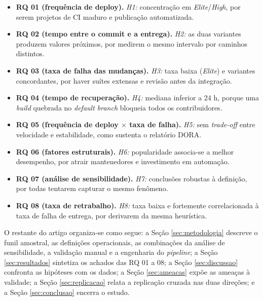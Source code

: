 \begin{itemize}
  \item \textbf{RQ 01 (frequência de deploy).} \emph{H1:} concentração em \emph{Elite}/\emph{High}, por serem
    projetos de CI maduro e publicação automatizada.
  \item \textbf{RQ 02 (tempo entre o commit e a entrega).} \emph{H2:} as duas variantes produzem valores próximos, por
    medirem o mesmo intervalo por caminhos distintos.
  \item \textbf{RQ 03 (taxa de falha das mudanças).} \emph{H3:} taxa baixa (\emph{Elite}) e variantes concordantes,
    por haver suítes extensas e revisão antes da integração.
  \item \textbf{RQ 04 (tempo de recuperação).} \emph{H4:} mediana inferior a 24 h, porque uma
    \emph{build} quebrada no \emph{default branch} bloqueia todos os contribuidores.
  \item \textbf{RQ 05 (frequência de deploy $\times$ taxa de falha).} \emph{H5:} sem \emph{trade-off} entre velocidade e
    estabilidade, como sustenta o relatório DORA.
  \item \textbf{RQ 06 (fatores estruturais).} \emph{H6:} popularidade associa-se a melhor desempenho,
    por atrair mantenedores e investimento em automação.
  \item \textbf{RQ 07 (análise de sensibilidade).} \emph{H7:} conclusões robustas à definição, por todas
    tentarem capturar o mesmo fenômeno.
  \item \textbf{RQ 08 (taxa de retrabalho).} \emph{H8:} taxa baixa e fortemente correlacionada à taxa de falha
    de entrega, por derivarem da mesma heurística.
\end{itemize}

O restante do artigo organiza-se como segue: a Seção \ref{sec:metodologia} descreve o funil
amostral, as definições operacionais, as combinações da análise de sensibilidade, a
validação manual e a engenharia do \emph{pipeline}; a Seção \ref{sec:resultados} sintetiza
os achados das RQ 01 a 08; a Seção \ref{sec:discussao} confronta as hipóteses com os dados;
a Seção \ref{sec:ameacas} expõe as ameaças à validade; a Seção \ref{sec:replicacao} relata a
replicação cruzada nas duas direções; e a Seção \ref{sec:conclusao} encerra o estudo.
